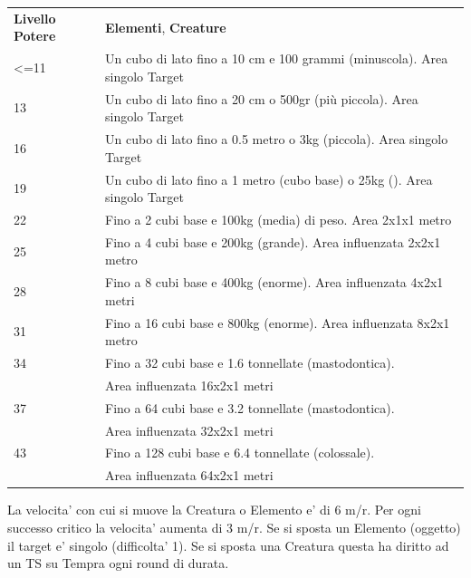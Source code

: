 \documentclass[a4paper,11pt,twoside,openany]{book}
\begin{document}
\begin{tabularx}{\textwidth}{lX}
	\toprule
	\textbf{Livello Potere} & \textbf{Elementi}, \textbf{Creature}\tabularnewline
	\textless=11            & Un cubo di lato fino a 10 cm e 100 grammi (minuscola). Area singolo
	Target\tabularnewline
	13          & Un cubo di lato fino a 20 cm o 500gr (più piccola). Area singolo Target\tabularnewline
	16          & Un cubo di lato fino a 0.5 metro o 3kg (piccola). Area singolo Target\tabularnewline
	19          & Un cubo di lato fino a 1 metro (cubo base) o 25kg (). Area singolo
	Target\tabularnewline
	22          & Fino a 2 cubi base e 100kg (media) di peso. Area 2x1x1 metro\tabularnewline
	25          & Fino a 4 cubi base e 200kg (grande). Area influenzata 2x2x1 metro\tabularnewline
	28          & Fino a 8 cubi base e 400kg (enorme). Area influenzata 4x2x1 metri\tabularnewline
	31          & Fino a 16 cubi base e 800kg (enorme). Area influenzata 8x2x1 metro\tabularnewline
	34          & Fino a 32 cubi base e 1.6 tonnellate (mastodontica).\\
	            & Area influenzata 16x2x1 metri\tabularnewline
	37          & Fino a 64 cubi base e 3.2 tonnellate (mastodontica).    \\
	            & Area influenzata 32x2x1 metri\tabularnewline
	43          & Fino a 128 cubi base e 6.4 tonnellate (colossale).  \\
	            & Area influenzata 64x2x1 metri\tabularnewline
\end{tabularx}

La velocita' con cui si muove la Creatura o Elemento e' di 6 m/r. Per ogni successo critico la velocita' aumenta di 3 m/r.
Se si sposta un Elemento (oggetto) il target e' singolo (difficolta' 1).
Se si sposta una Creatura questa ha diritto ad un TS su Tempra ogni round di durata.
\bigskip\
\end{document}

